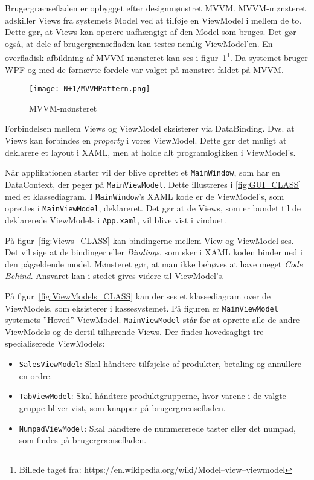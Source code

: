 Brugergrænsefladen er opbygget efter designmønstret \gls{MVVM}. MVVM-mønsteret adskiller Views fra systemets Model ved at tilføje en ViewModel i mellem de to. Dette gør, at Views kan operere uafhængigt af den Model som bruges. Det gør også, at dele af brugergrænsefladen kan testes nemlig ViewModel'en. En overfladisk afbildning af MVVM-mønsteret kan ses i figur~\ref{fig:MVVM}\footnote{Billede taget fra: https://en.wikipedia.org/wiki/Model–view–viewmodel}. Da systemet bruger WPF og med de førnævte fordele var valget på mønstret faldet på MVVM.

\begin{figure}[H]
\centering
\texttt{[image: N+1/MVVMPattern.png]}
\caption{MVVM-mønsteret}
\label{fig:MVVM}
\end{figure}

Forbindelsen mellem Views og ViewModel eksisterer via DataBinding. Dvs. at Views kan forbindes en \textit{property} i vores ViewModel. Dette gør det muligt at deklarere et layout i XAML, men at holde alt programlogikken i ViewModel's.


Når applikationen starter vil der blive oprettet et \texttt{MainWindow}, som har en DataContext, der peger på \texttt{MainViewModel}. Dette illustreres i \ref{fig:GUI_CLASS} med et klassediagram. I \texttt{MainWindow}'s XAML kode er de ViewModel's, som oprettes i \texttt{MainViewModel}, deklareret. Det gør at de Views, som er bundet til de deklarerede ViewModels i \texttt{App.xaml}, vil blive vist i vinduet.


På figur~\ref{fig:Views_CLASS} kan bindingerne mellem View og ViewModel ses. Det vil sige at de bindinger eller \textit{Bindings}, som sker i XAML koden binder ned i den pågældende model. Mønsteret gør, at man ikke behøves at have meget \textit{Code Behind}. Ansvaret kan i stedet gives videre til ViewModel's.


På figur~\ref{fig:ViewModels_CLASS} kan der ses et klassediagram over de ViewModels, som eksisterer i kassesystemet. På figuren er \texttt{MainViewModel} systemets ''Hoved''-ViewModel. \texttt{MainViewModel} står for at oprette alle de andre ViewModels og de dertil tilhørende Views. Der findes hovedsagligt tre specialiserede ViewModels:
\begin{itemize}
	\item \texttt{SalesViewModel}: Skal håndtere tilføjelse af produkter, betaling og annullere en ordre.
	\item \texttt{TabViewModel}: Skal håndtere produktgrupperne, hvor varene i de valgte gruppe bliver vist, som knapper på brugergrænsefladen.
	\item \texttt{NumpadViewModel}: Skal håndtere de nummererede taster eller det numpad, som findes på brugergrænsefladen.
\end{itemize}

